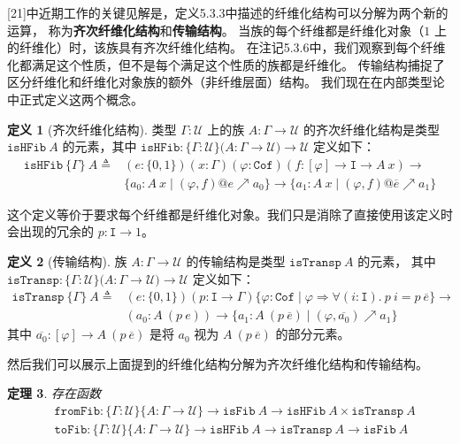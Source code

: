 \documentclass{ctexrep}
\theoremstyle{plain}
\newtheorem{theorem}{定理}[section]
\theoremstyle{definition}
\newtheorem{definition}[theorem]{定义}
\theoremstyle{remark}
\newcommand\ttI{\mathtt{I}}
\begin{document}
[21]中近期工作的关键见解是，定义5.3.3中描述的纤维化结构可以分解为两个新的运算，
称为\textbf{齐次纤维化结构}和\textbf{传输结构}。
当族的每个纤维都是纤维化对象（$1$ 上的纤维化）时，该族具有齐次纤维化结构。
在注记5.3.6中，我们观察到每个纤维化都满足这个性质，但不是每个满足这个性质的族都是纤维化。
传输结构捕捉了区分纤维化和纤维化对象族的额外（非纤维层面）结构。
我们现在在内部类型论中正式定义这两个概念。

\begin{definition}[齐次纤维化结构]
类型 $\Gamma : \mathcal{U}$ 上的族 $A : \Gamma \to \mathcal{U}$ 的齐次纤维化结构是类型 
$\mathtt{isHFib}\ A$ 的元素，其中 
$\mathtt{isHFib} : \{\Gamma : \mathcal{U}\}\big(A : \Gamma \to \mathcal{U}\big) \to \mathcal{U}$ 定义如下：
\begin{equation}
\begin{aligned}
\mathtt{isHFib}\ \{\Gamma\}\ A \triangleq & (e : \{0,1\})(x : \Gamma)(\varphi : \mathtt{Cof})(f : [\varphi] \to \ttI \to A\ x) \to \\
& \{a_0 : A\ x \mid (\varphi,f)@e \nearrow a_0\} \to \{a_1 : A\ x \mid (\varphi,f)@\overline{e} \nearrow a_1\}
\end{aligned}
\end{equation}
\end{definition}
这个定义等价于要求每个纤维都是纤维化对象。我们只是消除了直接使用该定义时会出现的冗余的 $p : \ttI \to 1$。

\begin{definition}[传输结构]
族 $A : \Gamma \to \mathcal{U}$ 的传输结构是类型 $\mathtt{isTransp}\ A$ 的元素，
其中 $\mathtt{isTransp} : \{\Gamma : \mathcal{U}\}\big(A : \Gamma \to \mathcal{U}\big) \to \mathcal{U}$ 定义如下：
\begin{equation}
\begin{aligned}
\mathtt{isTransp}\ \{\Gamma\}\ A \triangleq & (e : \{0,1\})(p : \ttI \to \Gamma)\{\varphi : \mathtt{Cof} \mid \varphi \Rightarrow \forall(i : \ttI).\ p\ i = p\ \overline{e}\} \to \\
& (a_0 : A\ (p\ e)) \to \{a_1 : A\ (p\ \overline{e}) \mid (\varphi, \overline{a_0}) \nearrow a_1\}
\end{aligned}
\end{equation}
其中 $\overline{a_0} : [\varphi] \to A\ (p\ \overline{e})$ 是将 $a_0$ 视为 $A\ (p\ \overline{e})$ 的部分元素。
\end{definition}

然后我们可以展示上面提到的纤维化结构分解为齐次纤维化结构和传输结构。

\begin{theorem}
存在函数
\begin{align}
& \mathtt{fromFib} : \{\Gamma : \mathcal{U}\}\{A : \Gamma \to \mathcal{U}\} \to \mathtt{isFib}\ A \to \mathtt{isHFib}\ A \times \mathtt{isTransp}\ A \\
& \mathtt{toFib} : \{\Gamma : \mathcal{U}\}\{A : \Gamma \to \mathcal{U}\} \to \mathtt{isHFib}\ A \to \mathtt{isTransp}\ A \to \mathtt{isFib}\ A
\end{align}
\end{theorem}
\end{document}
